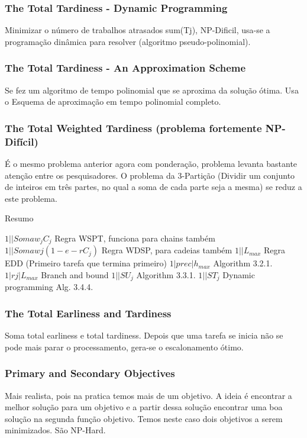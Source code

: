 \subsubsection{The Total Tardiness - Dynamic Programming}

Minimizar o número de trabalhos atrasados sum(Tj), NP-Dificil, usa-se a programação dinâmica para resolver (algoritmo pseudo-polinomial). 

\subsubsection{The Total Tardiness - An Approximation Scheme}
Se fez um algoritmo de tempo polinomial que se aproxima da solução ótima. Usa o Esquema de aproximação em tempo polinomial completo.

\subsubsection{The Total Weighted Tardiness (problema fortemente NP-Difícil)}
É o mesmo problema anterior agora com ponderação, problema levanta bastante atenção entre os pesquisadores. O problema da 3-Partição (Dividir um conjunto de inteiros em três partes, no qual a soma de cada parte seja a mesma) se reduz a este problema.

Resumo 

$1||Soma w_jC_j$	Regra WSPT, funciona para chains também
$1||Soma wj(1-e-rC_j)$	Regra WDSP, para cadeias também
$1||L_{max}$	Regra EDD (Primeiro tarefa que termina primeiro)
$1|prec| h_{max}$	Algorithm 3.2.1.
$1|rj|L_{max}$	Branch and bound
$1||S U_j$	Algorithm 3.3.1.
$1||S T_j$	Dynamic programming Alg. 3.4.4.
\\
\subsubsection{The Total Earliness and Tardiness}
Soma total earliness e total tardiness. Depois que uma tarefa se inicia não se pode mais parar o processamento, gera-se o escalonamento ótimo.
\\
\subsubsection{Primary and Secondary Objectives}
Mais realista, pois na pratica temos mais de um objetivo. A ideia é encontrar a melhor solução para um objetivo e a partir dessa solução encontrar uma boa solução na segunda função objetivo. Temos neste caso dois objetivos a serem minimizados. São NP-Hard.
\\

